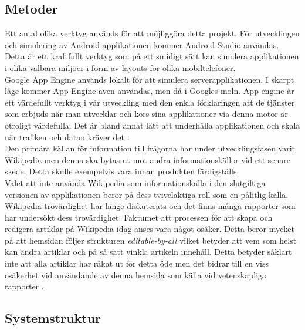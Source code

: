 \documentclass[a4paper, 11pt]{article}
\begin{document}
\subsection{Metoder}
Ett antal olika verktyg används för att möjliggöra detta projekt. För utvecklingen och simulering av Android-applikationen kommer Android Studio \cite{androidstudio} användas. Detta är ett kraftfullt verktyg som på ett smidigt sätt kan simulera applikationen i olika valbara miljöer i form av layouts för olika mobiltelefoner.\\
Google App Engine används lokalt för att simulera serverapplikationen. I skarpt läge kommer App Engine även användas, men då i Googles moln. App engine är ett värdefullt verktyg i vår utveckling med den enkla förklaringen att de tjänster som erbjuds när man utvecklar och körs sina applikationer via denna motor är otroligt värdefulla. Det är bland annat lätt att underhålla applikationen och skala när trafiken och datan kräver det  \cite{googleappengine}.\\
Den primära källan för information till frågorna har under utvecklingsfasen varit Wikipedia men denna ska bytas ut mot andra informationskällor vid ett senare skede. Detta skulle exempelvis vara innan produkten färdigställs.\\ 
Valet att inte använda Wikipedia som informationskälla i den slutgiltiga versionen av applikationen beror på dess tvivelaktiga roll som en pålitlig källa. Wikipedia trovärdighet har länge diskuterats och det finns många rapporter som har undersökt dess trovärdighet. Faktumet att processen för att skapa och redigera artiklar på Wikipedia idag anses vara något osäker. Detta beror mycket på att hemsidan följer strukturen \textit{editable-by-all} vilket betyder att vem som helst kan ändra artiklar och på så sätt vinkla artikeln innehåll. Detta betyder såklart inte att alla artiklar har råkat ut för detta öde men det bidrar till en viss osäkerhet vid användande av denna hemsida som källa vid vetenskapliga rapporter \cite{wikipediacred}.\\

\subsection{Systemstruktur}
\end{document}
